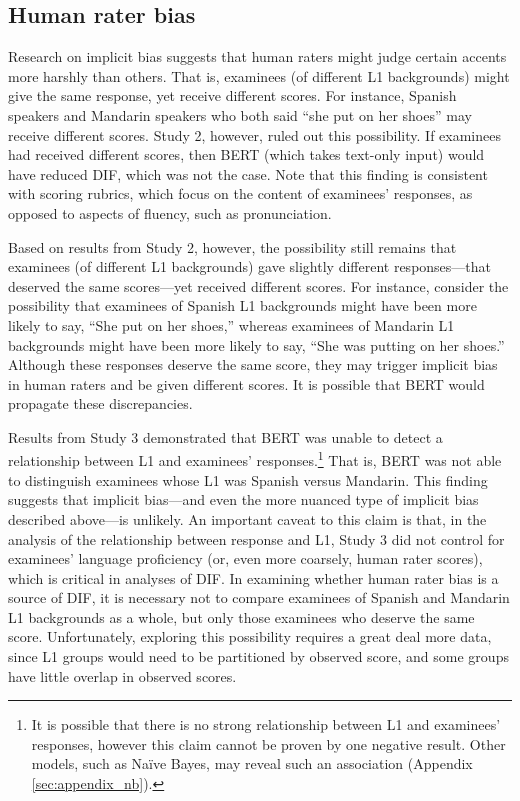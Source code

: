 \documentclass [PhD] {uclathes}
\begin{document}
\subsection{Human rater bias}

Research on implicit bias suggests that human raters might judge certain accents more harshly than others. That is, examinees (of different L1 backgrounds) might give the same response, yet receive different scores. For instance, Spanish speakers and Mandarin speakers who both said “she put on her shoes” may receive different scores. Study 2, however, ruled out this possibility. If examinees had received different scores, then BERT (which takes text-only input) would have reduced DIF, which was not the case. Note that this finding is consistent with scoring rubrics, which focus on the content of examinees’ responses, as opposed to aspects of fluency, such as pronunciation.

Based on results from Study 2, however, the possibility still remains that examinees (of different L1 backgrounds) gave slightly different responses—that deserved the same scores—yet received different scores. For instance, consider the possibility that examinees of Spanish L1 backgrounds might have been more likely to say, “She put on her shoes,” whereas examinees of Mandarin L1 backgrounds might have been more likely to say, “She was putting on her shoes.” Although these responses deserve the same score, they may trigger implicit bias in human raters and be given different scores. It is possible that BERT would propagate these discrepancies. 

Results from Study 3 demonstrated that BERT was unable to detect a relationship between L1 and examinees’ responses.\footnote{It is possible that there is no strong relationship between L1 and examinees' responses, however this claim cannot be proven by one negative result. Other models, such as Naïve Bayes, may reveal such an association (Appendix \ref{sec:appendix_nb}).} That is, BERT was not able to distinguish examinees whose L1 was Spanish versus Mandarin. This finding suggests that implicit bias—and even the more nuanced type of implicit bias described above—is unlikely. An important caveat to this claim is that, in the analysis of the relationship between response and L1, Study 3 did not control for examinees’ language proficiency (or, even more coarsely, human rater scores), which is critical in analyses of DIF. In examining whether human rater bias is a source of DIF, it is necessary not to compare examinees of Spanish and Mandarin L1 backgrounds as a whole, but only those examinees who deserve the same score. Unfortunately, exploring this possibility requires a great deal more data, since L1 groups would need to be partitioned by observed score, and some groups have little overlap in observed scores. 
\end{document}
